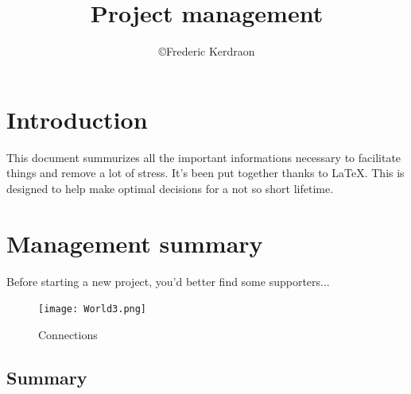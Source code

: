 \documentclass[8pt]{article} %
\title{Project management}
\author{\copyright Frederic Kerdraon}
\begin{document}
\maketitle
\tableofcontents

\section{Introduction}

This document summurizes all the important informations necessary to facilitate things and remove a lot of stress. It's been put together thanks to \LaTeX. This is designed to help make optimal decisions for a not so short lifetime.

%


\newcommand{\slice}[4]{
  \pgfmathparse{0.5*#1+0.5*#2}
  \let\midangle\pgfmathresult

   slice
  \draw[thick,fill=black!10] (0,0) -- (#1:1) arc (#1:#2:1) -- cycle;

   outer label
  \node[label=\midangle:#4] at (\midangle:1) {};

   inner label
  \pgfmathparse{min((#2-#1-10)/110*(-0.3),0)}
  \let\temp\pgfmathresult
  \pgfmathparse{max(\temp,-0.5) + 0.8}
  \let\innerpos\pgfmathresult
  \node at (\midangle:\innerpos) {#3};
}

\section{Management summary}

Before starting a new project, you'd better find some supporters...
\begin{figure}[ht!]
\centering
\texttt{[image: World3.png]}
\caption{Connections \label{overflow}}
\end{figure}



\subsection{Summary}
\end{document}
